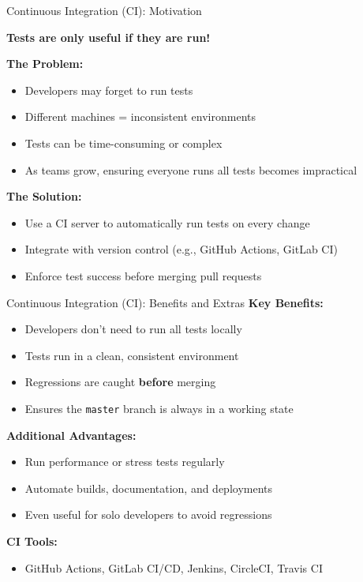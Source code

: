 \begin{frame}{Continuous Integration (CI): Motivation}
	
	\textbf{Tests are only useful if they are run!}
	
	\vspace{1em}
	\textbf{The Problem:}
	\begin{itemize}
		\item Developers may forget to run tests
		\item Different machines = inconsistent environments
		\item Tests can be time-consuming or complex
		\item As teams grow, ensuring everyone runs all tests becomes impractical
	\end{itemize}
	\pause
	\vspace{1em}
	\textbf{The Solution:}
	\begin{itemize}
		\item Use a CI server to automatically run tests on every change
		\item Integrate with version control (e.g., GitHub Actions, GitLab CI)
		\item Enforce test success before merging pull requests
	\end{itemize}
	
\end{frame}

\begin{frame}{Continuous Integration (CI): Benefits and Extras}
	\textbf{Key Benefits:}
	\begin{itemize}
		\item Developers don't need to run all tests locally
		\item Tests run in a clean, consistent environment
		\item Regressions are caught \textbf{before} merging
		\item Ensures the \texttt{master} branch is always in a working state
	\end{itemize}
	
	\vspace{0.5em}
	\textbf{Additional Advantages:}
	\begin{itemize}
		\item Run performance or stress tests regularly
		\item Automate builds, documentation, and deployments
		\item Even useful for solo developers to avoid regressions
	\end{itemize}
	
	\vspace{0.5em}
	\textbf{CI Tools:}
	\begin{itemize}
		\item GitHub Actions, GitLab CI/CD, Jenkins, CircleCI, Travis CI
	\end{itemize}
	
\end{frame}

